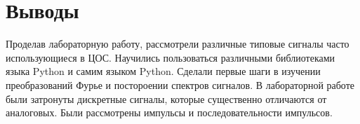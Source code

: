 \section{Выводы}
Проделав лабораторную работу, рассмотрели различные типовые сигналы часто использующиеся в ЦОС. Научились пользоваться различными библиотеками языка Python и самим языком Python. Сделали первые шаги в изучении преобразований Фурье и постороении спектров сигналов. В лабораторной работе были затронуты дискретные сигналы, которые существенно отличаются от аналоговых. Были рассмотрены импульсы и последовательности импульсов.




